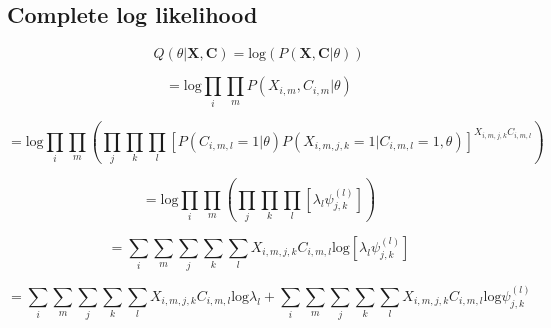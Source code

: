 \documentclass[12pt]{article}
\theoremstyle{definition}
\begin{document}
\subsection{Complete log likelihood}

\begin{equation}
	Q(\theta | \boldsymbol{X}, \boldsymbol{C}) = \textrm{log}(P(\boldsymbol{X}, \boldsymbol{C} | \theta))
\end{equation}

\begin{equation}
	= \textrm{log} \prod_{i}\prod_{m}P(X_{i,m}, C_{i, m} | \theta)
\end{equation}

\begin{equation}
= \textrm{log} \prod_{i}\prod_{m}(\prod_{j}\prod_{k}\prod_{l}[P(C_{i,m,l}=1|\theta)P(X_{i,m,j,k}=1|C_{i,m,l}=1, \theta)]^{X_{i, m, j, k}C_{i, m, l}})
\end{equation}

\begin{equation}
= \textrm{log} \prod_{i}\prod_{m}(\prod_{j}\prod_{k}\prod_{l}[\lambda_{l}\psi_{j, k}^{(l)}])
\end{equation}

\begin{equation}
= \sum_{i}\sum_{m}\sum_{j}\sum_{k}\sum_{l}X_{i,m,j,k}C_{i, m, l}\textrm{log}[\lambda_{l}\psi_{j, k}^{(l)}]
\end{equation}

\begin{equation}
= \sum_{i}\sum_{m}\sum_{j}\sum_{k}\sum_{l}X_{i,m,j,k}C_{i, m, l} \textrm{log}\lambda_{l} + \sum_{i}\sum_{m}\sum_{j}\sum_{k}\sum_{l}X_{i,m,j,k}C_{i, m, l}\textrm{log}\psi_{j, k}^{(l)}
\end{equation}
\end{document}
